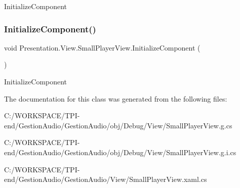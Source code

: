 Initialize\+Component 

\mbox{\label{class_presentation_1_1_view_1_1_small_player_view_a1199bc28ab3753d6689a2aaa87142c09}} 
\subsubsection{\texorpdfstring{Initialize\+Component()}{InitializeComponent()}\hspace{0.1cm}{\footnotesize\ttfamily [4/4]}}
{\footnotesize\ttfamily void Presentation.\+View.\+Small\+Player\+View.\+Initialize\+Component (\begin{DoxyParamCaption}{ }\end{DoxyParamCaption})}



Initialize\+Component 



The documentation for this class was generated from the following files\+:\begin{DoxyCompactItemize}
\item 
C\+:/\+W\+O\+R\+K\+S\+P\+A\+C\+E/\+T\+P\+I-\/end/\+Gestion\+Audio/\+Gestion\+Audio/obj/\+Debug/\+View/Small\+Player\+View.\+g.\+cs\item 
C\+:/\+W\+O\+R\+K\+S\+P\+A\+C\+E/\+T\+P\+I-\/end/\+Gestion\+Audio/\+Gestion\+Audio/obj/\+Debug/\+View/Small\+Player\+View.\+g.\+i.\+cs\item 
C\+:/\+W\+O\+R\+K\+S\+P\+A\+C\+E/\+T\+P\+I-\/end/\+Gestion\+Audio/\+Gestion\+Audio/\+View/Small\+Player\+View.\+xaml.\+cs\end{DoxyCompactItemize}
